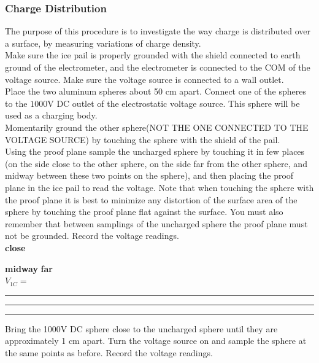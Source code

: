 {{{\subsubsection{Charge Distribution}
\noindent The purpose of this procedure is to investigate the way
charge is distributed over a surface, by measuring variations
of charge density.\\
Make sure the ice pail is properly grounded with the shield
connected to earth ground of the electrometer, and the 
electrometer is connected to the COM  of the voltage source.
Make sure the voltage source is connected to a wall outlet.\\
\noindent Place the two aluminum spheres about 50 cm apart.
Connect one of the spheres to the $1000$V DC outlet of the
electrostatic voltage source.  This sphere will be used as a
charging body.\\
\noindent Momentarily ground the other sphere(NOT THE ONE
CONNECTED TO THE VOLTAGE SOURCE) by touching the sphere with the
shield of the pail. \\
\noindent Using the proof plane sample the uncharged sphere by
touching it in few places (on the side close to the other sphere,
on the side far from the other sphere, and midway between these two
points on the sphere), and then placing the proof plane in the ice
pail to read the voltage. Note that when touching the sphere with
the proof plane it is best to minimize any distortion of the
surface area of the sphere by touching the proof plane flat
against
the surface.  You must also remember that between samplings of the uncharged 
sphere the proof plane must not be grounded.  Record the voltage readings.\\

  \hspace{3.6cm} \textbf{close} }\hspace{2cm} \textbf{midway} \hspace{2.2cm} \textbf{far}\\

\vspace{1cm}
  \hspace{2cm}$V_{1C}=$\rule{2.5cm}{.1mm}\hspace{1cm}\rule{2.5cm}{.1mm}\hspace{1cm}\rule{2.5cm}{.1mm}

\vspace{1cm}

\noindent Bring the 1000V DC sphere close to the uncharged sphere
until they are approximately 1 cm apart.  Turn the voltage source
on and sample the sphere at the same points as before.  Record the
voltage readings.\\


}}
